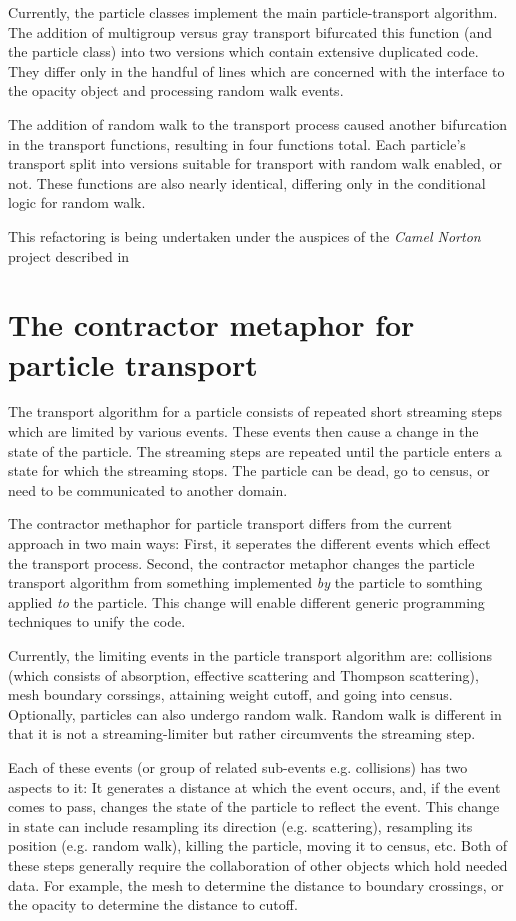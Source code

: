 \documentclass[memo]{ResearchNote}
\begin{document}
Currently, the particle classes implement the main particle-transport
algorithm.  The addition of multigroup versus gray transport
bifurcated this function (and the particle class) into two versions
which contain extensive duplicated code. They differ only in the
handful of lines which are concerned with the interface to the opacity
object and processing random walk events.

The addition of random walk to the transport process caused another
bifurcation in the transport functions, resulting in four functions
total. Each particle's transport split into versions suitable for
transport with random walk enabled, or not. These functions are also
nearly identical, differing only in the conditional logic for random
walk.

This refactoring is being undertaken under the auspices of the {\em
  Camel Norton} project described in~\cite{ccs-4:04-13}

\section{The contractor metaphor for particle transport}

The transport algorithm for a particle consists of repeated short
streaming steps which are limited by various events. These events then
cause a change in the state of the particle. The streaming steps are
repeated until the particle enters a state for which the streaming
stops. The particle can be dead, go to census, or need to be
communicated to another domain.

The contractor methaphor for particle transport differs from the
current approach in two main ways: First, it seperates the different
events which effect the transport process. Second, the contractor
metaphor changes the particle transport algorithm from something
implemented {\em by} the particle to somthing applied {\em to} the
particle. This change will enable different generic programming
techniques to unify the code.

Currently, the limiting events in the particle transport algorithm
are: collisions (which consists of absorption, effective scattering
and Thompson scattering), mesh boundary corssings, attaining weight
cutoff, and going into census. Optionally, particles can also undergo
random walk. Random walk is different in that it is not a
streaming-limiter but rather circumvents the streaming step.

Each of these events (or group of related sub-events e.g. collisions)
has two aspects to it: It generates a distance at which the event
occurs, and, if the event comes to pass, changes the state of the
particle to reflect the event. This change in state can include
resampling its direction (e.g. scattering), resampling its position
(e.g. random walk), killing the particle, moving it to census, etc.
Both of these steps generally require the collaboration of other
objects which hold needed data. For example, the mesh to determine the
distance to boundary crossings, or the opacity to determine the
distance to cutoff.
\end{document}
